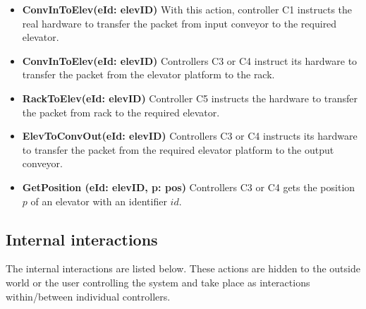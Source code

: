 \begin{itemize}
\item \textbf{ConvInToElev(eId: elevID)}
With this action, controller C1 instructs the real hardware to transfer the packet from input conveyor to the required elevator.

\item \textbf{ConvInToElev(eId: elevID)}
Controllers C3 or C4 instruct its hardware to transfer the packet from the elevator platform to the rack.

\item \textbf{RackToElev(eId: elevID)}
Controller C5 instructs the hardware to transfer the packet from rack to the required elevator.

\item \textbf{ElevToConvOut(eId: elevID)}
Controllers C3 or C4 instructs its hardware to transfer the packet from the required elevator platform to the output conveyor.

\item \textbf{GetPosition (eId: elevID, p: pos)}
Controllers C3 or C4 gets the position $p$ of an elevator with an identifier $id$.

\end{itemize}

\subsection*{Internal interactions}
The internal interactions are listed below. These actions are hidden to the outside world or the user controlling the system and take place as interactions within/between individual controllers.

